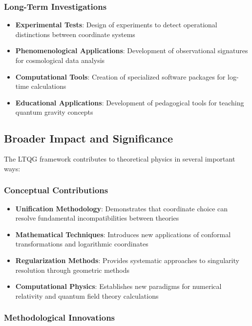 \subsubsection{Long-Term Investigations}

\begin{itemize}
\item \textbf{Experimental Tests}: Design of experiments to detect operational distinctions between coordinate systems
\item \textbf{Phenomenological Applications}: Development of observational signatures for cosmological data analysis
\item \textbf{Computational Tools}: Creation of specialized software packages for log-time calculations
\item \textbf{Educational Applications}: Development of pedagogical tools for teaching quantum gravity concepts
\end{itemize}

\subsection{Broader Impact and Significance}
\label{subsec:broader_impact}

The LTQG framework contributes to theoretical physics in several important ways:

\subsubsection{Conceptual Contributions}

\begin{itemize}
\item \textbf{Unification Methodology}: Demonstrates that coordinate choice can resolve fundamental incompatibilities between theories
\item \textbf{Mathematical Techniques}: Introduces new applications of conformal transformations and logarithmic coordinates
\item \textbf{Regularization Methods}: Provides systematic approaches to singularity resolution through geometric methods
\item \textbf{Computational Physics}: Establishes new paradigms for numerical relativity and quantum field theory calculations
\end{itemize}

\subsubsection{Methodological Innovations}

